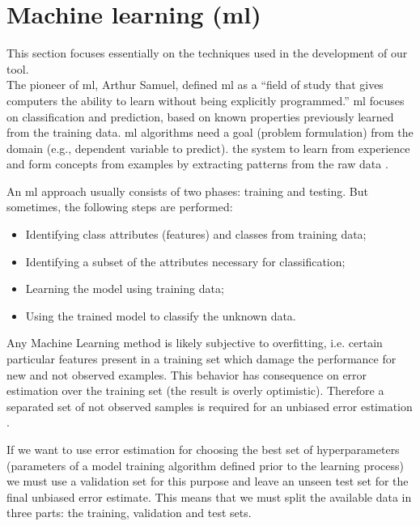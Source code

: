 \section{Machine learning (\gls{ml})} %
\label{sec: Machine_learning}

This section focuses essentially on the techniques used in the development of our tool.\\

The pioneer of \gls{ml}, Arthur Samuel, defined \gls{ml} as a “field of study that gives computers the ability to learn without being explicitly programmed.” \gls{ml} focuses on classification and prediction, based on known properties previously learned from the training data. \gls{ml} algorithms need a goal (problem formulation) from the domain (e.g., dependent variable to predict). the system to learn from experience and form concepts from examples by extracting patterns from the raw data \cite{Goodfellow_et_al_2016}.

An \gls{ml} approach usually consists of two phases: training and testing. But sometimes, the following steps are performed:

\begin{itemize}
\item  Identifying class attributes (features) and classes from training data;
\item  Identifying a subset of the attributes necessary for classification;
\item  Learning the model using training data;
\item  Using the trained model to classify the unknown data.
\end{itemize}

Any Machine Learning method is likely subjective to overfitting, i.e. certain particular features present in a training set which damage the performance for new and not observed examples. This behavior has consequence on error estimation over the training set (the result is overly optimistic). Therefore a separated set of not observed samples is required for an unbiased error estimation \cite{C_M_Bishop2006}. 

If we want to use error estimation for choosing the best set of hyperparameters (parameters of a model training algorithm defined prior to the learning process) we must use a validation set for this purpose and leave an unseen test set for the final unbiased error estimate. This means that we must split the available data in three parts: the training, validation and test sets.

